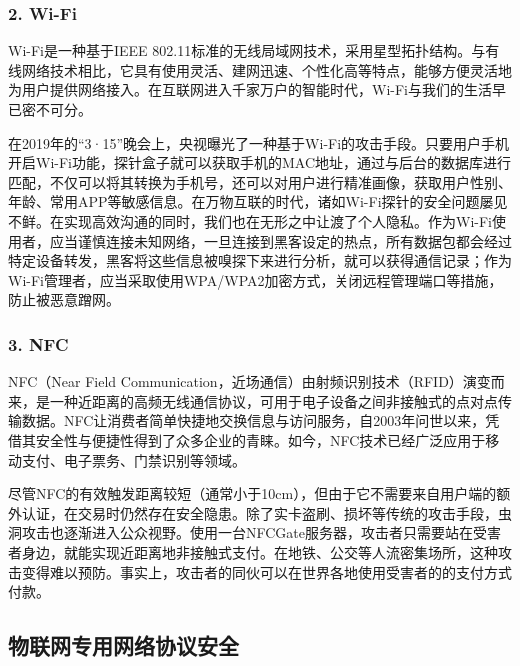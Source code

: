 \subsubsection{\textcolor{myblue}{\textbf{2. Wi-Fi}}}
\par Wi-Fi是一种基于IEEE 802.11标准的无线局域网技术，采用星型拓扑结构。与有线网络技术相比，它具有使用灵活、建网迅速、个性化高等特点，能够方便灵活地为用户提供网络接入。在互联网进入千家万户的智能时代，Wi-Fi与我们的生活早已密不可分。
\par 在2019年的“3·15”晚会上，央视曝光了一种基于Wi-Fi的攻击手段。只要用户手机开启Wi-Fi功能，探针盒子就可以获取手机的MAC地址，通过与后台的数据库进行匹配，不仅可以将其转换为手机号，还可以对用户进行精准画像，获取用户性别、年龄、常用APP等敏感信息。在万物互联的时代，诸如Wi-Fi探针的安全问题屡见不鲜。在实现高效沟通的同时，我们也在无形之中让渡了个人隐私。作为Wi-Fi使用者，应当谨慎连接未知网络，一旦连接到黑客设定的热点，所有数据包都会经过特定设备转发，黑客将这些信息被嗅探下来进行分析，就可以获得通信记录；作为Wi-Fi管理者，应当采取使用WPA/WPA2加密方式，关闭远程管理端口等措施，防止被恶意蹭网。
 
\subsubsection{\textcolor{myblue}{\textbf{3. NFC}}}
\par NFC（Near Field Communication，近场通信）由射频识别技术（RFID）演变而来，是一种近距离的高频无线通信协议，可用于电子设备之间非接触式的点对点传输数据。NFC让消费者简单快捷地交换信息与访问服务，自2003年问世以来，凭借其安全性与便捷性得到了众多企业的青睐。如今，NFC技术已经广泛应用于移动支付、电子票务、门禁识别等领域。
\par 尽管NFC的有效触发距离较短（通常小于10cm），但由于它不需要来自用户端的额外认证，在交易时仍然存在安全隐患。除了实卡盗刷、损坏等传统的攻击手段，虫洞攻击\cite{giese2019security}也逐渐进入公众视野。使用一台NFCGate服务器，攻击者只需要站在受害者身边，就能实现近距离地非接触式支付。在地铁、公交等人流密集场所，这种攻击变得难以预防。事实上，攻击者的同伙可以在世界各地使用受害者的的支付方式付款。

\subsection{物联网专用网络协议安全}
\label{specific_security}

